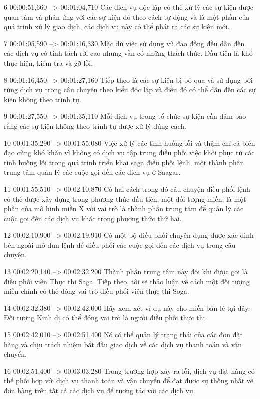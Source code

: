 6
00:00:51,660 --> 00:01:04,710
Các dịch vụ độc lập có thể xử lý các sự kiện được quan tâm và phản ứng với các sự kiện đó theo cách tự động và là một phần của quá trình xử lý giao dịch, các dịch vụ này có thể phát ra các sự kiện mới.

7
00:01:05,590 --> 00:01:16,330
Mặc dù việc sử dụng vũ đạo đồng đều dẫn đến các dịch vụ có tính tách rời cao nhưng vẫn có những thách thức.  Đầu tiên là khó thực hiện, kiểm tra và gỡ lỗi.

8
00:01:16,450 --> 00:01:27,160
Tiếp theo là các sự kiện bị bỏ qua và sử dụng bởi từng dịch vụ trong câu chuyện theo kiểu độc lập và điều đó có thể dẫn đến các sự kiện không theo trình tự.

9
00:01:27,550 --> 00:01:35,110
Mỗi dịch vụ trong tổ chức sự kiện cần đảm bảo rằng các sự kiện không theo trình tự được xử lý đúng cách.

10
00:01:35,290 --> 00:01:55,080
Việc xử lý các tình huống lỗi và thậm chí cả biên đạo cũng khó khăn vì không có dịch vụ tập trung điều phối việc khôi phục từ các tình huống lỗi trong quá trình triển khai saga điều phối lệnh, một thành phần trung tâm quản lý các cuộc gọi đến các dịch vụ ở Saagar.

11
00:01:55,510 --> 00:02:10,870
Có hai cách trong đó câu chuyện điều phối lệnh có thể được xây dựng trong phương thức đầu tiên, một đối tượng miền, là một phần của mô hình miền X với vai trò là thành phần trung tâm để quản lý các cuộc gọi đến các dịch vụ khác trong phương thức thứ hai.

12
00:02:10,900 --> 00:02:19,910
Có một bộ điều phối chuyên dụng được xác định bên ngoài mô-đun lệnh để điều phối các cuộc gọi đến các dịch vụ trong câu chuyện.

13
00:02:20,140 --> 00:02:32,200
Thành phần trung tâm này đôi khi được gọi là điều phối viên Thực thi Saga.  Tiếp theo, tôi sẽ thảo luận về cách một đối tượng miền chính có thể đóng vai trò điều phối viên thực thi Soga.

14
00:02:32,380 --> 00:02:42,000
Hãy xem xét ví dụ này cho miền bán lẻ tại đây.  Đối tượng Kinh dị có thể đóng vai trò là người điều phối thực thi.

15
00:02:42,010 --> 00:02:51,400
Nó có thể quản lý trạng thái của các đơn đặt hàng và chịu trách nhiệm bắt đầu giao dịch về các dịch vụ thanh toán và vận chuyển.

16
00:02:51,400 --> 00:03:03,280
Trong trường hợp xảy ra lỗi, dịch vụ đặt hàng có thể phối hợp với dịch vụ thanh toán và vận chuyển để đạt được sự thống nhất về đơn hàng trên tất cả các dịch vụ để tương tác với các dịch vụ.

